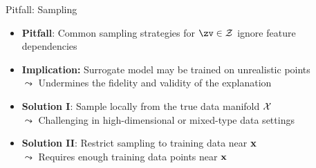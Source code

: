 \documentclass[10pt,compress,t,notes=noshow, xcolor=table]{beamer}
\begin{document}
\begin{frame}{Pitfall: Sampling}
	\begin{itemize}
	\itemsep1em
	  \item \textbf{Pitfall}: Common sampling strategies for $\zv \in \Zspace$ ignore feature dependencies
        \item \textbf{Implication:} Surrogate model may be trained on unrealistic points\\
  $\leadsto$ Undermines the fidelity and validity of the explanation
      \pause
      \item \textbf{Solution I}: Sample locally from the true data manifold $\mathcal{X}$\\
  $\leadsto$ Challenging in high-dimensional or mixed-type data settings
      \item \textbf{Solution II}: Restrict sampling to training data near $\mathbf{x}$\\
      $\leadsto$ Requires enough training data points near $\mathbf{x}$
    \end{itemize}
    
\end{frame}
\end{document}
